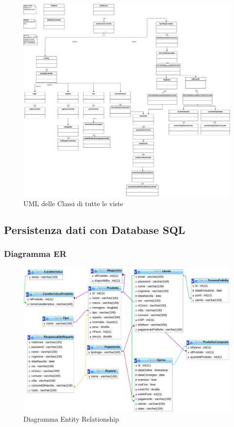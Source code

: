 \documentclass{article}
\begin{document}
\begin{figure}[h!]
	\centering
	\includegraphics[width=\textwidth]{UmlInterfaccie.jpg}
	\caption{UML delle Classi di tutte le viste}
	\label{fig:UmlInterfaccie}
\end{figure}

\clearpage
\subsection{Persistenza dati con Database SQL}
\subsubsection{Diagramma ER}

\begin{figure}[h!]
	\centering
	\includegraphics[width=\textwidth]{DiagrammaER.png}
	\caption{Diagramma Entity Relationship}
	\label{fig:DiagrammaER}
\end{figure}
\end{document}
